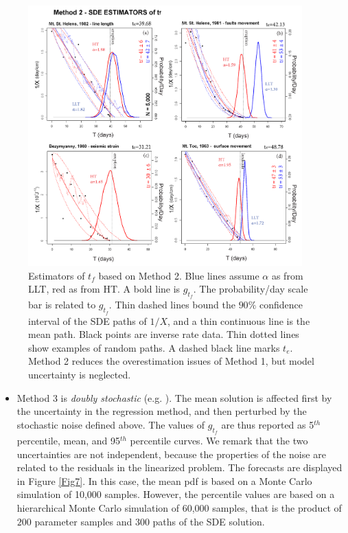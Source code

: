 \documentclass{article}
\begin{document}
\begin{figure}[H]
\centering
\includegraphics[width=0.94\textwidth]{Fig6_plusX.png}
\caption{Estimators of $t_f$ based on Method 2. Blue lines assume $\alpha$ as from LLT, red as from HT. A bold line is $g_{t_f}$. The probability/day scale bar is related to $g_{t_f}$. Thin dashed lines bound the $90\%$ confidence interval of the SDE paths of $1/X$, and a thin continuous line is the mean path. Black points are inverse rate data. Thin dotted lines show examples of random paths. A dashed black line marks $t_e$. Method 2 reduces the overestimation issues of Method 1, but model uncertainty is neglected.}
\label{Fig6}
\end{figure}

\begin{itemize}
\item Method 3 is \emph{doubly stochastic} (e.g. \cite{Bevilacqua2016}). The mean solution is affected first by the uncertainty in the regression method, and then perturbed by the stochastic noise defined above. The values of $g_{t_f}$ are thus reported as 5$^{th}$ percentile, mean, and 95$^{th}$ percentile curves. We remark that the two uncertainties are not independent, because the properties of the noise are related to the residuals in the linearized problem. The forecasts are displayed in Figure \ref{Fig7}. In this case, the mean pdf is based on a Monte Carlo simulation of 10,000 samples. However, the percentile values are based on a hierarchical Monte Carlo simulation of 60,000 samples, that is the product of $200$ parameter samples and $300$ paths of the SDE solution.
\end{itemize}
\end{document}
